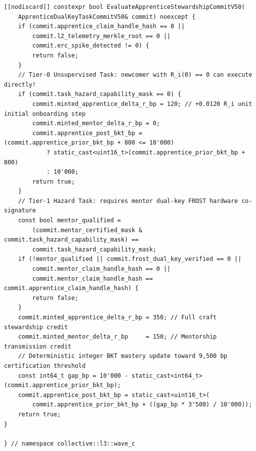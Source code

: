 \begin{lstlisting}
[[nodiscard]] constexpr bool EvaluateApprenticeStewardshipCommitV50(
    ApprenticeDualKeyTaskCommitV50& commit) noexcept {
    if (commit.apprentice_claim_handle_hash == 0 ||
        commit.l2_telemetry_merkle_root == 0 ||
        commit.erc_spike_detected != 0) {
        return false;
    }
    // Tier-0 Unsupervised Task: newcomer with R_i(0) == 0 can execute directly!
    if (commit.task_hazard_capability_mask == 0) {
        commit.minted_apprentice_delta_r_bp = 120; // +0.0120 R_i unit initial onboarding step
        commit.minted_mentor_delta_r_bp = 0;
        commit.apprentice_post_bkt_bp = (commit.apprentice_prior_bkt_bp + 800 <= 10'000)
            ? static_cast<uint16_t>(commit.apprentice_prior_bkt_bp + 800)
            : 10'000;
        return true;
    }
    // Tier-1 Hazard Task: requires mentor dual-key FROST hardware co-signature
    const bool mentor_qualified =
        (commit.mentor_certified_mask & commit.task_hazard_capability_mask) ==
        commit.task_hazard_capability_mask;
    if (!mentor_qualified || commit.frost_dual_key_verified == 0 ||
        commit.mentor_claim_handle_hash == 0 ||
        commit.mentor_claim_handle_hash == commit.apprentice_claim_handle_hash) {
        return false;
    }
    commit.minted_apprentice_delta_r_bp = 350; // Full craft stewardship credit
    commit.minted_mentor_delta_r_bp     = 150; // Mentorship transmission credit
    // Deterministic integer BKT mastery update toward 9,500 bp certification threshold
    const int64_t gap_bp = 10'000 - static_cast<int64_t>(commit.apprentice_prior_bkt_bp);
    commit.apprentice_post_bkt_bp = static_cast<uint16_t>(
        commit.apprentice_prior_bkt_bp + ((gap_bp * 3'500) / 10'000));
    return true;
}

} // namespace collective::l3::wave_c
\end{lstlisting}
